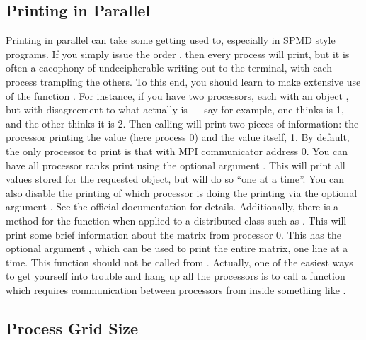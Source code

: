 \subsection[]{Printing in Parallel}

Printing in parallel can take some getting used to, especially in SPMD style programs.  If you simply issue the order , then every process will print, but it is often a cacophony of undecipherable writing out to the terminal, with each process trampling the others.  
\np
To this end, you should learn to make extensive use of the  function .  For instance, if you have two processors, each with an object , but with disagreement to what  actually is --- say for example, one thinks  is 1, and the other thinks it is 2.  Then calling  will print two pieces of information:  the processor printing the value (here process 0) and the value itself, 1.  By default, the only processor to print is that with MPI communicator address 0.  You can have all processor ranks print using the optional argument .  This will print all values stored for the requested object, but will do so ``one at a time''.  You can also disable the printing of which processor is doing the printing via the optional argument .  See the official  documentation for details.
\np
Additionally, there is a method for the  function when applied to a distributed class such as .  This will print some brief information about the matrix from processor 0.  This has the optional argument , which can be used to print the entire matrix, one line at a time.
\np
This function should not be called from .  Actually, one of the easiest ways to get yourself into trouble and hang up all the processors is to call a function which requires communication between processors from inside something like .

\subsection[]{Process Grid Size}

